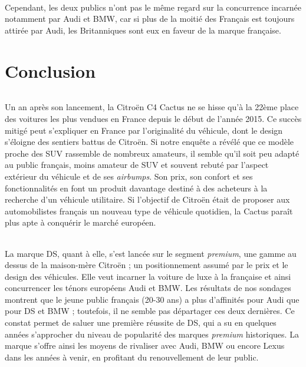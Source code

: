 \documentclass[12pt]{article}\usepackage[]{graphicx}\usepackage[]{color}
\begin{document}
\paragraph{} Cependant, les deux publics n'ont pas le même regard sur la concurrence
incarnée notamment par Audi et BMW, car si plus de la moitié des Français est
toujours attirée par Audi, les Britanniques sont eux en faveur de la marque française.

\break

\part{Conclusion}

\paragraph{} Un an après son lancement, la Citroën C4 Cactus ne se hisse qu'à la 22ème place des voitures les plus vendues en France depuis le début de l’année 2015. Ce succès mitigé peut s'expliquer en France par l'originalité du véhicule, dont le design s'éloigne des sentiers battus de Citroën. Si notre enquête a révélé que ce modèle proche des SUV rassemble de nombreux amateurs, il semble qu'il soit peu adapté au public français, moins amateur de SUV et souvent rebuté par l'aspect extérieur du véhicule et de ses \textit{airbumps}. Son prix, son confort et ses fonctionnalités en font un produit davantage destiné à des acheteurs à la recherche d'un véhicule utilitaire. Si l'objectif de Citroën était de proposer aux automobilistes français un nouveau type de véhicule quotidien, la Cactus paraît plus apte à conquérir le marché européen.


\paragraph{} La marque DS, quant à elle, s’est lancée sur le segment \textit{premium}, une gamme au dessus de la maison-mère Citroën ; un positionnement assumé par le prix et le design des véhicules. Elle veut incarner la voiture de luxe à la française et ainsi concurrencer les ténors européens Audi et BMW. Les résultats de nos sondages montrent que le jeune public français (20-30 ans) a plus d'affinités pour Audi que pour DS et BMW ; toutefois, il ne semble pas départager ces deux dernières. Ce constat permet de saluer une première réussite de DS, qui a su en quelques années s'approcher du niveau de popularité des marques \textit{premium} historiques. La marque s'offre ainsi les moyens de rivaliser avec Audi, BMW ou encore Lexus dans les années à venir, en profitant du renouvellement de leur public.
\end{document}
